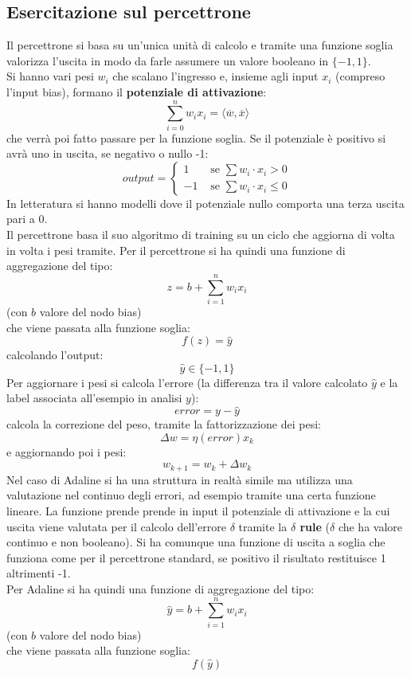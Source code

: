 \documentclass[a4paper,12pt, oneside]{book}
\begin{document}
\subsection{Esercitazione sul percettrone}
Il percettrone si basa su un'unica unità di calcolo e tramite una funzione
soglia valorizza l'uscita in modo da farle assumere un valore booleano in
$\{-1,1\}$.\\
Si hanno vari pesi $w_i$ che scalano l'ingresso e, insieme agli input $x_i$
(compreso l'input bias),
formano il \textbf{potenziale di attivazione}:
\[\sum_{i=0}^nw_ix_i=\langle \overline{w}, \overline{x}\rangle\]
che verrà poi fatto passare per la funzione
soglia. Se il potenziale è positivo si avrà uno in uscita, se negativo o nullo
-1:
\[output=
  \begin{cases}
    1 &\mbox{ se } \sum w_i\cdot x_i > 0\\
    -1 &\mbox{ se } \sum w_i\cdot x_i \leq 0
  \end{cases}
\]
In letteratura si hanno modelli dove il potenziale nullo comporta una terza
uscita pari a 0.\\
Il percettrone basa il suo algoritmo di training su un ciclo che aggiorna di
volta in volta i pesi tramite.
Per il percettrone si ha quindi una funzione di aggregazione del tipo:
\[z=b+\sum_{i=1}^nw_ix_i\]
(con $b$ valore del nodo bias)\\
che viene passata alla funzione soglia:
\[f(z)=\hat{y}\]
 calcolando l'output:
\[\hat{y}\in\{-1,1\}\]
Per aggiornare i pesi si calcola l'errore (la differenza tra il valore calcolato
$\hat{y}$ e la label associata all'esempio in analisi $y$):
\[error=y-\hat{y}\]
calcola la correzione del peso, tramite la fattorizzazione dei pesi:
\[\Delta w=\eta(error)x_k\]
e aggiornando poi i pesi:
\[w_{k+1}=w_k+\Delta w_k\]
Nel caso di Adaline si ha una struttura in realtà simile ma utilizza una
valutazione nel continuo degli errori, ad esempio tramite una certa funzione
lineare. La funzione prende prende in input il potenziale di attivazione e la
cui uscita viene valutata per il calcolo dell'errore $\delta$ tramite la
\textbf{$\delta$ rule} ($\delta$ che ha valore continuo e non booleano). Si ha
comunque una funzione di uscita a soglia che funziona come per il percettrone
standard, se positivo il risultato restituisce 1 altrimenti -1.\\
Per Adaline si ha quindi una funzione di aggregazione del tipo:
\[\hat{y}=b+\sum_{i=1}^nw_ix_i\]
(con $b$ valore del nodo bias)\\
che viene passata alla funzione soglia:
\[f(\hat{y})\]
\end{document}
